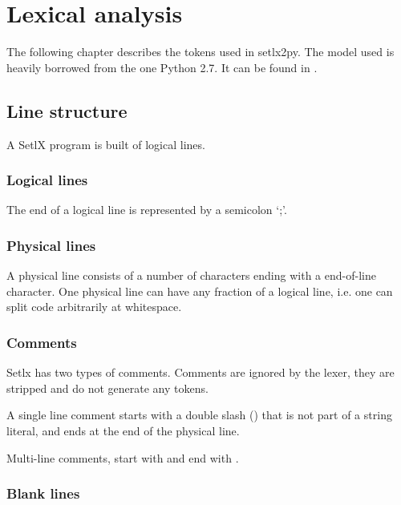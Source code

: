 \section{Lexical analysis}

The following chapter describes the tokens used in setlx2py. The model used is heavily borrowed from the one Python 2.7. It can be found in \cite{py2}.

%
%
\subsection{Line structure}

A SetlX program is built of logical lines.

%
\subsubsection{Logical lines}

The end of a logical line is represented by a semicolon `;'.

%
\subsubsection{Physical lines}

A physical line consists of a number of characters ending with a end-of-line character. One physical line can have any fraction of a logical line, i.e. one can split code arbitrarily at whitespace.

%
\subsubsection{Comments}

Setlx has two types of comments. Comments are ignored by the lexer, they are stripped and do not generate any tokens.


A single line comment starts with a double slash (\token{//}) that is not part of a string literal, and ends at the end of the physical line. 


Multi-line comments, start with \token{/*} and end with \token{*/}.

%
\subsubsection{Blank lines}

